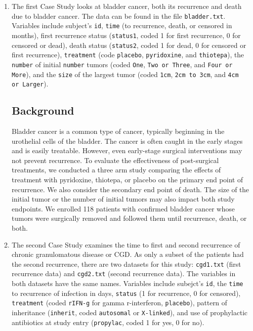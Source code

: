\documentclass{article}
\begin{document}
	\begin{enumerate}
		\item The first Case Study looks at bladder cancer, both its recurrence and death due to bladder cancer. The data can be found in the file \texttt{bladder.txt}. Variables include subject's \texttt{id}, \texttt{time} (to recurrence, death, or censored in months), first recurrence status (\texttt{status1}, coded 1 for first recurrence, 0 for censored or dead), death status (\texttt{status2}, coded 1 for dead, 0 for censored or first recurrence), \texttt{treatment} (code \texttt{placebo}, \texttt{pyridoxine}, and \texttt{thiotepa}), the \texttt{number} of initial \texttt{number} tumors (coded \texttt{One}, \texttt{Two or Three}, and \texttt{Four or More}), and the \texttt{size} of the largest tumor (coded \texttt{1cm}, \texttt{2cm to 3cm}, and \texttt{4cm or Larger}).
			
	\subsection*{Background} %

	Bladder cancer is a common type of cancer, typically beginning in the urothelial cells of the bladder. The cancer is often caught in the early stages and is easily treatable. However, even early-stage surgical interventions may not prevent recurrence. To evaluate the effectiveness of post-surgical treatments, we conducted a three arm study comparing the effects of treatment with pyridoxine, thiotepa, or placebo on the primary end point of recurrence. We also consider the secondary end point of death. The size of the initial tumor or the number of initial tumors may also impact both study endpoints. We enrolled 118 patients with confirmed bladder cancer whose tumors were surgically removed and followed them until recurrence, death, or both.
		
		\item The second Case Study examines the time to first and second recurrence of chronic granulomatous disease or CGD. As only a subset of the patients had the second recurrence, there are two datasets for this study: \texttt{cgd1.txt} (first recurrence data) and \texttt{cgd2.txt} (second recurrence data). The variables in both datasets have the same names. Variables include subejct's \texttt{id}, the \texttt{time} to recurrence of infection in days, \texttt{status} (1 for recurrence, 0 for censored), \texttt{treatment} (coded \texttt{rIFN-g} for gamma r-interferon, \texttt{placebo}), pattern of inheritance (\texttt{inherit}, coded \texttt{autosomal} or \texttt{X-linked}), and use of prophylactic antibiotics at study entry (\texttt{propylac}, coded 1 for yes, 0 for no).


\end{enumerate}
\end{document}
